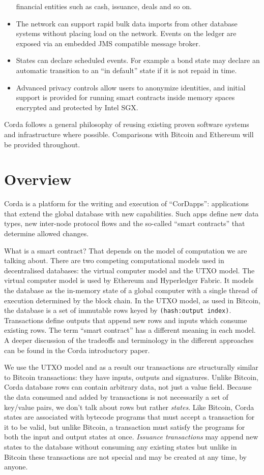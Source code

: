 \documentclass{article}
\begin{document}
\begin{itemize}
financial entities such as cash, issuance, deals and so on.
\item The network can support rapid bulk data imports from other database systems without placing load on the network.
Events on the ledger are exposed via an embedded JMS compatible message broker.
\item States can declare scheduled events. For example a bond state may declare an automatic transition to an
``in default'' state if it is not repaid in time.
\item Advanced privacy controls allow users to anonymize identities, and initial support is provided for running
smart contracts inside memory spaces encrypted and protected by Intel SGX.
\end{itemize}

Corda follows a general philosophy of reusing existing proven software systems and infrastructure where possible.
Comparisons with Bitcoin and Ethereum will be provided throughout.

\newpage

\section{Overview}

Corda is a platform for the writing and execution of ``CorDapps'': applications that extend the global database
with new capabilities. Such apps define new data types, new inter-node protocol flows and the so-called ``smart
contracts'' that determine allowed changes.

What is a smart contract? That depends on the model of computation we are talking about. There are two competing
computational models used in decentralised databases: the virtual computer model and the UTXO model. The virtual
computer model is used by Ethereum\cite{Ethereum} and Hyperledger Fabric. It models the database as the in-memory
state of a global computer with a single thread of execution determined by the block chain. In the UTXO model, as
used in Bitcoin, the database is a set of immutable rows keyed by \texttt{(hash:output index)}. Transactions define
outputs that append new rows and inputs which consume existing rows. The term ``smart contract'' has a different
meaning in each model. A deeper discussion of the tradeoffs and terminology in the different approaches can be
found in the Corda introductory paper\cite{CordaIntro}.

We use the UTXO model and as a result our transactions are structurally similar to Bitcoin transactions: they have
inputs, outputs and signatures. Unlike Bitcoin, Corda database rows can contain arbitrary data, not just a value
field. Because the data consumed and added by transactions is not necessarily a set of key/value pairs, we don't
talk about rows but rather \emph{states}. Like Bitcoin, Corda states are associated with bytecode programs that
must accept a transaction for it to be valid, but unlike Bitcoin, a transaction must satisfy the programs for both
the input and output states at once. \emph{Issuance transactions} may append new states to the database without
consuming any existing states but unlike in Bitcoin these transactions are not special and may be created at any
time, by anyone.
\end{document}
